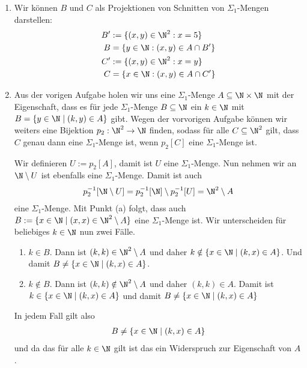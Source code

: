 \begin{solution}

\phantom{}
	\begin{enumerate}[label = (\alph*)]
		\item
		Wir können $B$ und $C$ als Projektionen von Schnitten von $\Sigma_1$-Mengen darstellen:
		\begin{align*}
			B^{\prime} &:= \{(x,y) \in \N^2: x = 5\} \\
			B &= \{y \in \N: (x,y) \in A \cap B^{\prime}\} \\
			C^{\prime} &:= \{(x,y) \in \N^2: x = y\} \\
			C &= \{x \in \N: (x,y) \in A \cap C^{\prime}\}
		\end{align*}
		\item Aus der vorigen Aufgabe holen wir uns eine $\Sigma_1$-Menge $A \subseteq \N \times \N$
		mit der Eigenschaft, dass es für jede $\Sigma_1$-Menge $B \subseteq \N$
		ein $k \in \N$ mit $B = \{y \in \N \mid (k,y) \in A\}$ gibt.
		Wegen der vorvorigen Aufgabe können wir weiters eine Bijektion
		$p_2: \N^2 \to \N$ finden, sodass für alle $C \subseteq \N^2$ gilt,
		dass $C$ genau dann eine $\Sigma_1$-Menge ist, wenn $p_2[C]$ eine $\Sigma_1$-Menge ist.

		Wir definieren $U := p_2[A]$, damit ist $U$ eine $\Sigma_1$-Menge. Nun nehmen wir an $\N \setminus U$ ist ebenfalls eine $\Sigma_1$-Menge. Damit ist auch
		\begin{align*}
			p_2^{-1}[\N \setminus U] = p_2^{-1}[\N] \setminus p_2^{-1}[U] = \N^2 \setminus A
		\end{align*}
		eine $\Sigma_1$-Menge. Mit Punkt (a) folgt, dass auch $B := \{x \in \N \mid (x,x) \in \N^2 \setminus A\}$ eine $\Sigma_1$-Menge ist. Wir unterscheiden für beliebiges $k \in \N$ nun zwei Fälle.
		\begin{enumerate}[label = Fall \arabic*:]
			\item $k \in B$. Dann ist $(k,k) \in \N^2 \setminus A$ und daher $k \notin \{x \in \N \mid (k,x) \in A\}$. Und damit $B \neq \{x \in \N \mid (k,x) \in A\}$.
			\item $k \notin B$. Dann ist $(k,k) \notin \N^2 \setminus A$ und daher $(k,k) \in A$. Damit ist  $k \in \{x \in \N \mid (k,x) \in A\}$ und damit $B \neq \{x \in \N \mid (k,x) \in A\}$
		\end{enumerate}
	In jedem Fall gilt also
	\begin{align*}
		B \neq \{x \in \N \mid (k,x) \in A\}
	\end{align*}
	und da das für alle $k \in \N$ gilt ist das ein Widerspruch zur Eigenschaft von $A$.
	\end{enumerate}

\end{solution}
